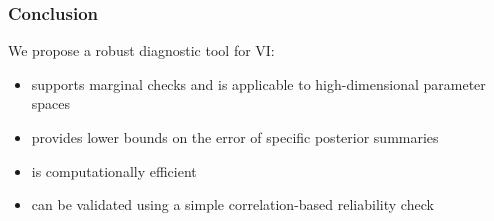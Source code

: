 \documentclass[10pt,xcolor=table]{beamer}
\begin{document}
\begin{frame}
	\frametitle{Conclusion}
	We propose a robust diagnostic tool for VI:
		\begin{itemize}
			\item supports marginal checks and is applicable to high-dimensional parameter spaces
			\item provides lower bounds on the error of specific posterior summaries
			\item is computationally efficient
			\item can be validated using a simple correlation-based reliability check
		\end{itemize}

\end{frame}




\end{document}
